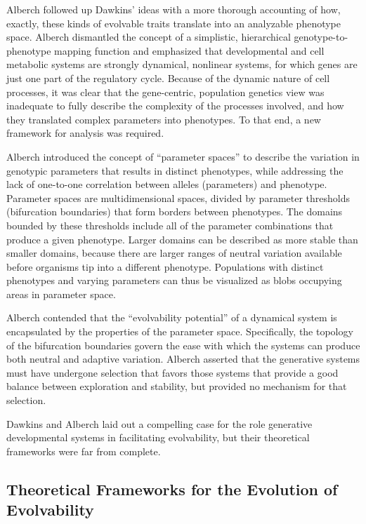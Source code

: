 \documentclass[PhD]{msu-thesis}
\begin{document}
Alberch followed up Dawkins’ ideas with a more thorough accounting of how, exactly, these kinds of evolvable traits translate into an analyzable phenotype space\cite{alberch_genes_1991}. Alberch dismantled the concept of a simplistic, hierarchical genotype-to-phenotype mapping function and emphasized that developmental and cell metabolic systems are strongly dynamical, nonlinear systems, for which genes are just one part of the regulatory cycle. Because of the dynamic nature of cell processes, it was clear that the gene-centric, population genetics view was inadequate to fully describe the complexity of the processes involved, and how they translated complex parameters into phenotypes. To that end, a new framework for analysis was required.

Alberch introduced the concept of “parameter spaces” to describe the variation in genotypic parameters that results in distinct phenotypes, while addressing the lack of one-to-one correlation between alleles (parameters) and phenotype. Parameter spaces are multidimensional spaces, divided by parameter thresholds (bifurcation boundaries) that form borders between phenotypes. The domains bounded by these thresholds include all of the parameter combinations that produce a given phenotype. Larger domains can be described as more stable than smaller domains, because there are larger ranges of neutral variation available before organisms tip into a different phenotype. Populations with distinct phenotypes and varying parameters can thus be visualized as blobs occupying areas in parameter space.

Alberch contended that the “evolvability potential” of a dynamical system is encapsulated by the properties of the parameter space. Specifically, the topology of the bifurcation boundaries govern the ease with which the systems can produce both neutral and adaptive variation. Alberch asserted that the generative systems must have undergone selection that favors those systems that provide a good balance between exploration and stability, but provided no mechanism for that selection.

Dawkins and Alberch laid out a compelling case for the role generative developmental systems in facilitating evolvability, but their theoretical frameworks were far from complete.



\subsection{Theoretical Frameworks for the Evolution of Evolvability}
\end{document}
